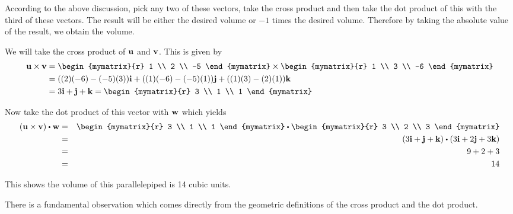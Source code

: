\begin{solution}
According to the above discussion, pick any two of these vectors, take the cross
product and then take the dot product of this with the third of these
vectors. The result will be either the desired volume or $-1$ times the desired
volume. Therefore by taking the absolute value of the result, we obtain the volume. 

We will take the cross product of ${\bf u}$ and ${\bf v}$. 
This is given by 
\begin{align*}
\vect{u} \times \vect{v}
&=
\begin{mymatrix}{r}
1 \\
2 \\
-5
\end{mymatrix}
\times
\begin{mymatrix}{r}
1 \\
3 \\
-6
\end{mymatrix}\\
&=((2)(-6)-(-5)(3))\vect{i}+((1)(-6)-(-5)(1))\vect{j}+((1)(3)-(2)(1))\vect{k} \\
&= 3\vect{i}+\vect{j}+\vect{k}
=
\begin{mymatrix}{r}
3 \\
1 \\
1
\end{mymatrix} 
\end{align*}

Now take the dot product of this vector with ${\bf w}$ which yields
\begin{eqnarray*}
(\vect{u} \times \vect{v}) \dotprod \vect{w}
&=&
\begin{mymatrix}{r}
3 \\
1 \\
1
\end{mymatrix}
\dotprod
\begin{mymatrix}{r}
3 \\
2 \\
3 
\end{mymatrix} \\
&=&\tup{3\vect{i}+\vect{j}+\vect{k}} \dotprod
 \tup{3\vect{i}+2\vect{j}+3\vect{k}} \\
&=&9+2+3 \\
&=&14
\end{eqnarray*}

This shows the volume of this parallelepiped is 14 cubic units.
\end{solution}

There is a fundamental observation which comes directly from the geometric
definitions of the cross product and the dot product.

